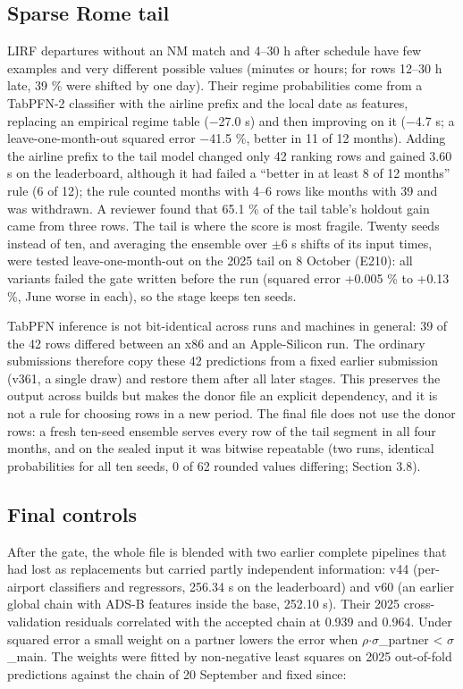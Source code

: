 \documentclass[11pt,a4paper]{article}
\begin{document}
\subsection{Sparse Rome tail}\label{sparse-rome-tail}

LIRF departures without an NM match and 4--30 h after schedule have few examples and very different possible values (minutes or hours; for rows 12--30 h late, 39 \% were shifted by one day). Their regime probabilities come from a TabPFN-2 classifier \autocite{hollmann2025tabpfn} with the airline prefix and the local date as features, replacing an empirical regime table ($-$27.0 s) and then improving on it ($-$4.7 s; a leave-one-month-out squared error $-$41.5 \%, better in 11 of 12 months). Adding the airline prefix to the tail model changed only 42 ranking rows and gained 3.60 s on the leaderboard, although it had failed a ``better in at least 8 of 12 months'' rule (6 of 12); the rule counted months with 4--6 rows like months with 39 and was withdrawn. A reviewer found that 65.1 \% of the tail table's holdout gain came from three rows. The tail is where the score is most fragile. Twenty seeds instead of ten, and averaging the ensemble over $\pm$6 s shifts of its input times, were tested leave-one-month-out on the 2025 tail on 8 October (E210): all variants failed the gate written before the run (squared error +0.005 \% to +0.13 \%, June worse in each), so the stage keeps ten seeds.

TabPFN inference is not bit-identical across runs and machines in general: 39 of the 42 rows differed between an x86 and an Apple-Silicon run. The ordinary submissions therefore copy these 42 predictions from a fixed earlier submission (v361, a single draw) and restore them after all later stages. This preserves the output across builds but makes the donor file an explicit dependency, and it is not a rule for choosing rows in a new period. The final file does not use the donor rows: a fresh ten-seed ensemble serves every row of the tail segment in all four months, and on the sealed input it was bitwise repeatable (two runs, identical probabilities for all ten seeds, 0 of 62 rounded values differing; Section 3.8).

\subsection{Final controls}\label{final-controls}

After the gate, the whole file is blended with two earlier complete pipelines that had lost as replacements but carried partly independent information: v44 (per-airport classifiers and regressors, 256.34 s on the leaderboard) and v60 (an earlier global chain with ADS-B features inside the base, 252.10 s). Their 2025 cross-validation residuals correlated with the accepted chain at 0.939 and 0.964. Under squared error a small weight on a partner lowers the error when $\rho$$\cdot$$\sigma$\_partner \textless{} $\sigma$\_main. The weights were fitted by non-negative least squares on 2025 out-of-fold predictions against the chain of 20 September and fixed since:
\end{document}
